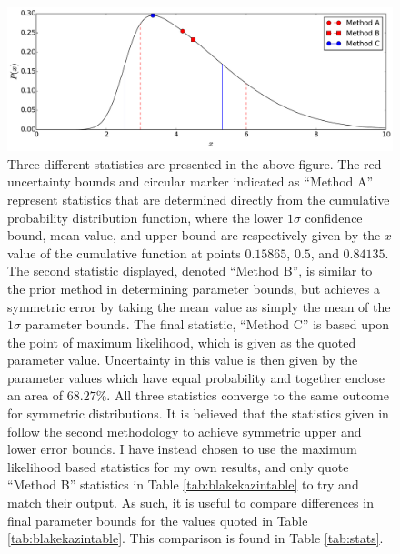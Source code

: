 \documentclass[titlesmallcaps, examinerscopy, copyrightpage]{uqthesis}
\begin{document}
\begin{figure}[h]
  \begin{center}
    \includegraphics[width=\textwidth]{images/stats.pdf}
  \end{center}
  \caption{Three different statistics are presented in the above figure. The red uncertainty bounds and circular marker indicated as ``Method A'' represent statistics that are determined directly from the cumulative probability distribution function, where the lower $1\sigma$ confidence bound, mean value, and upper bound are respectively given by the $x$ value of the cumulative function at points $0.15865$, $0.5$, and $0.84135$. The second statistic displayed, denoted ``Method B'', is similar to the prior method in determining parameter bounds, but achieves a symmetric error by taking the mean value as simply the mean of the $1\sigma$ parameter bounds. The final statistic, ``Method C'' is based upon the point of maximum likelihood, which is given as the quoted parameter value. Uncertainty in this value is then given by the parameter values which have equal probability and together enclose an area of $68.27\%$. All three statistics converge to the same outcome for symmetric distributions. It is believed that the statistics given in \citet{BlakeKazin2011} follow the second methodology to achieve symmetric upper and lower error bounds. I have instead chosen to use the maximum likelihood based statistics for my own results, and only quote ``Method B'' statistics in Table \ref{tab:blakekazintable} to try and match their output. As such, it is useful to compare differences in final parameter bounds for the values quoted in Table \ref{tab:blakekazintable}. This comparison is found in Table \ref{tab:stats}.}
  \label{fig:statistics}
\end{figure}
\end{document}
